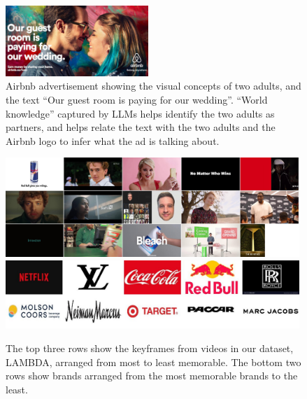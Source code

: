 \begin{figure}[]
    \centering
    \includegraphics[width=0.48\textwidth]{images/airbnb.png}
    \caption{Airbnb advertisement showing the visual concepts of two adults, and the text ``Our guest room is paying for our wedding''. ``World knowledge'' captured by LLMs helps identify the two adults as partners, and helps relate the text with the two adults and the Airbnb logo to infer what the ad is talking about.}
    \label{fig:airbnb-ad}
\end{figure}


\begin{figure}[]
    \centering
    \includegraphics[width=0.99\textwidth]{images/collage.jpg}
    \centering
    \includegraphics[width=0.99\textwidth]{images/brands.jpg}
    \caption{The top three rows show the keyframes from videos in our dataset, LAMBDA, arranged from most to least memorable. The bottom two rows show brands arranged from the most memorable brands to the least. 
    }
    \label{fig:Memorable brands}
\end{figure}



